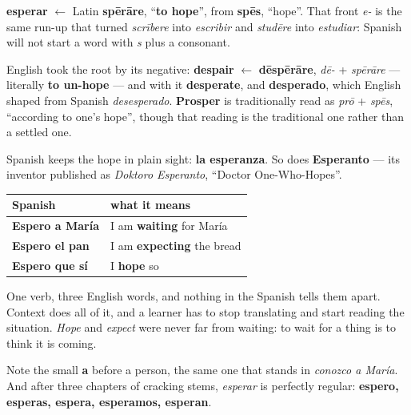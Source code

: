 \begin{cousinweb}
\textbf{esperar} $\leftarrow$ Latin \textbf{spērāre}, \textquotedblleft{}\textbf{to hope}\textquotedblright{}, from \textbf{spēs}, \textquotedblleft{}hope\textquotedblright{}. That front \emph{e-} is the same run-up that turned \emph{scrībere} into \emph{escribir} and \emph{studēre} into \emph{estudiar}: Spanish will not start a word with \emph{s} plus a consonant.

English took the root by its negative: \textbf{despair} $\leftarrow$ \textbf{dēspērāre}, \emph{dē-} + \emph{spērāre} — literally \textbf{to un-hope} — and with it \textbf{desperate}, and \textbf{desperado}, which English shaped from Spanish \emph{desesperado}. \textbf{Prosper} is traditionally read as \emph{prō} + \emph{spēs}, \textquotedblleft{}according to one's hope\textquotedblright{}, though that reading is the traditional one rather than a settled one.

Spanish keeps the hope in plain sight: \textbf{la esperanza}. So does \textbf{Esperanto} — its inventor published as \emph{Doktoro Esperanto}, \textquotedblleft{}Doctor One-Who-Hopes\textquotedblright{}.
\end{cousinweb}

\begin{grammarlens}[title={Grammar Lens: three English verbs, one Spanish word}]
\noindent
\begin{tabularx}{\linewidth}{@{}>{\raggedright\arraybackslash}X>{\raggedright\arraybackslash}X@{}}
\toprule
\textbf{Spanish} & \textbf{what it means} \\
\midrule
\textbf{Espero a María} & I am \textbf{waiting} for María \\
\textbf{Espero el pan} & I am \textbf{expecting} the bread \\
\textbf{Espero que sí} & I \textbf{hope} so \\
\bottomrule
\end{tabularx}

One verb, three English words, and nothing in the Spanish tells them apart. Context does all of it, and a learner has to stop translating and start reading the situation. \emph{Hope} and \emph{expect} were never far from waiting: to wait for a thing is to think it is coming.

Note the small \textbf{a} before a person, the same one that stands in \emph{conozco a María}. And after three chapters of cracking stems, \emph{esperar} is perfectly regular: \textbf{espero, esperas, espera, esperamos, esperan}.
\end{grammarlens}

